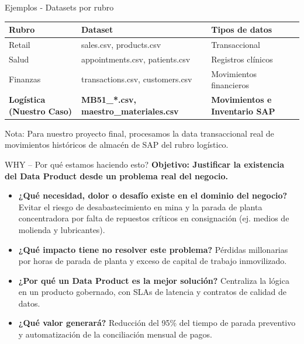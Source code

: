 \documentclass[aspectratio=169,10pt]{beamer}
\begin{document}
\begin{frame}{Ejemplos - Datasets por rubro}
    \centering
    \small
    \begin{table}[h]
        \begin{tabular}{lll}
            \toprule
            \textbf{Rubro} & \textbf{Dataset} & \textbf{Tipos de datos} \\
            \midrule
            Retail & sales.csv, products.csv & Transaccional \\
            Salud & appointments.csv, patients.csv & Registros clínicos \\
            Finanzas & transactions.csv, customers.csv & Movimientos financieros \\
            \rowcolor{UtecCyan!20} \textbf{Logística (Nuestro Caso)} & \textbf{MB51\_*.csv, maestro\_materiales.csv} & \textbf{Movimientos e Inventario SAP} \\
            \bottomrule
        \end{tabular}
    \end{table}
    \vspace{0.4cm}
    \footnotesize
    \color{UtecDarkGray!70}
    Nota: Para nuestro proyecto final, procesamos la data transaccional real de movimientos históricos de almacén de SAP del rubro logístico.
\end{frame}

\begin{frame}{WHY -- Por qué estamos haciendo esto?}
    \textbf{Objetivo: Justificar la existencia del Data Product desde un problema real del negocio.}
    \vspace{0.4cm}
    \begin{itemize}
        \item \textbf{¿Qué necesidad, dolor o desafío existe en el dominio del negocio?}
          Evitar el riesgo de desabastecimiento en mina y la parada de planta concentradora por falta de repuestos críticos en consignación (ej. medios de molienda y lubricantes).
        \item \textbf{¿Qué impacto tiene no resolver este problema?}
          Pérdidas millonarias por horas de parada de planta y exceso de capital de trabajo inmovilizado.
        \item \textbf{¿Por qué un Data Product es la mejor solución?}
          Centraliza la lógica en un producto gobernado, con SLAs de latencia y contratos de calidad de datos.
        \item \textbf{¿Qué valor generará?}
          Reducción del 95\% del tiempo de parada preventivo y automatización de la conciliación mensual de pagos.
    \end{itemize}
\end{frame}
\end{document}
